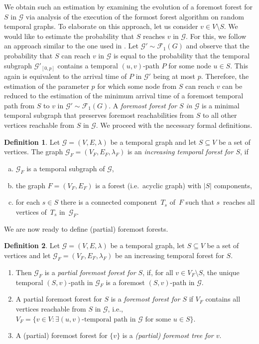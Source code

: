 \documentclass[a4paper,11pt]{article}
\theoremstyle{definition}
\newtheorem{definition}{Definition}
\theoremstyle{plain}
\newcommand{\GGG}{\mathcal{G}}
\newcommand{\G}{\mathcal G}
\newcommand{\F}{\mathcal F}
\begin{document}
We obtain such an estimation by examining the evolution of a foremost forest for $S$ in $\G$ via analysis of the execution of the formost forest algorithm on random temporal graphs.
To elaborate on this approach, let us consider $v \in V \setminus S$. We would like to estimate the probability that $S$ reaches $v$ in $\G$.
For this, we follow an approach similar to the one used in \cite{CasteigtsRRZ21}.
Let $\G'\sim \F_{1}(G)$ and observe that
the probability that $S$ can reach $v$ in $\G$ is equal to the probability that the temporal subgraph $\G'_{[0, p]}$ contains a temporal $(u, v)$-path $P$ for some node $u\in S$. This again is equivalent to the arrival time of $P$ in $\G'$ being at most $p$.
Therefore, the estimation of the parameter $p$ for which some node from $S$ can reach $v$ can be reduced to the estimation of the minimum arrival time of a foremost temporal path from $S$ to $v$ in $\G'\sim \F_{1}(G)$. A \emph{foremost forest for $S$ in $\G$} is a minimal temporal subgraph that preserves foremost reachabilities from $S$ to all other vertices reachable from $S$ in $\G$.
We proceed with the necessary formal definitions.
\begin{definition}\label{def: increasing temporal forest}
	Let $\GGG=(V, E, \lambda)$ be a temporal graph and let $S\subseteq V$ be a set of vertices.
	The graph $\GGG_F=(V_F, E_F, \lambda_F)$ is an \emph{increasing temporal forest for $S$}, if
	\begin{enumerate}[(a)]
	\item $\GGG_F$ is a temporal subgraph of $\GGG$,
	\item the graph $F=(V_F, E_F)$ is a forest (i.e.\ acyclic graph) with $|S|$ components,
	\item for each $s \in S$ there is a connected component~$T_s$ of~$F$ such that $s$~reaches all vertices of~$T_s$ in~$\GGG_F$.
	\end{enumerate}
\end{definition}
We are now ready to define (partial) foremost forests.
\begin{definition}\label{def: foremost forest}
	Let $\GGG=(V, E, \lambda)$ be a temporal graph, let $S\subseteq V$ be a set of vertices and let $\GGG_F=(V_F, E_F, \lambda_F)$ be an increasing temporal forest for $S$.
	\begin{enumerate}
			\item Then $\GGG_F$ is a \emph{partial foremost forest for $S$}, if, for all $v\in V_F \setminus S$, the unique temporal $(S, v)$-path in $\GGG_F$ is a foremost $(S, v)$-path in $\GGG$.
			\item A partial foremost forest for $S$ is a \emph{foremost forest for $S$} if $V_F$ contains all vertices reachable from $S$ in $\GGG$, i.e., $V_F=\{v\in V: \exists (u, v)\text{-temporal path in $\G$ for some }u\in S\}$.
			\item A (partial) foremost forest for $\{v\}$ is a \emph{(partial) foremost tree for $v$}.
		\end{enumerate}
\end{definition}
\end{document}
